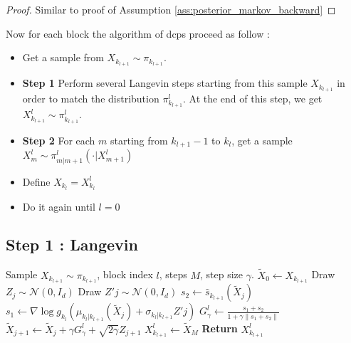 \documentclass[12pt]{article}
\begin{document}
\begin{proof}
    Similar to proof of Assumption \ref{ass:posterior_markov_backward}
\end{proof}

Now for each block the algorithm of dcps proceed as follow :
\begin{itemize}
\item Get a sample from $X_{k_{l+1}} \sim \pi_{k_{l+1}}$.
\item \textbf{Step 1} Perform several Langevin steps starting from this sample $X_{k_{l+1}}$ in order to 
match the distribution $\pi^l_{k_{l+1}}$. At the end of this step, we get $X^l_{k_{l+1}} \sim \pi^l_{k_{l+1}}$.
\item \textbf{Step 2} For each $m$ starting from $k_{l+1}-1$ to $k_l$, get a sample $X^l_{m} \sim \pi^l_{m|m+1}(\cdot|X^l_{m+1})$
\item Define $X_{k_l} = X^l_{k_l}$
\item Do it again until $l=0$
\end{itemize}

\subsection{Step 1 : Langevin }

\begin{algorithm}
\caption{DCPS Step 1: Langevin guidance for block $l$}
\label{alg:dcps_step1}
\begin{algorithmic}[1]
    \Require Sample $X_{k_{l+1}} \sim \pi_{k_{l+1}}$, block index $l$, steps $M$, step size $\gamma$.
    \State $\tilde{X}_0 \gets X_{k_{l+1}}$
        \State Draw $Z_{j} \sim \mathcal{N}(0, I_d)$
        \State Draw $Z'{j} \sim \mathcal{N}(0, I_d)$
        \State $s_2 \gets \hat{s}_{k_{l+1}}(\tilde{X}_j)$
        \State $s_1 \gets \nabla \log g_{k_l}(\mu_{k_l|k_{l+1}}(\tilde{X}_j) + \sigma_{k_l|k_{l+1}} Z'{j})$
        \State $G_\gamma^l \gets \frac{s_1 + s_2}
        {1 + \gamma \|s_1 + s_2\|}$ 
        \State $\tilde{X}_{j+1} \gets \tilde{X}_j + \gamma G_\gamma^l + \sqrt{2 \gamma} Z_{j+1}$
    \EndFor
    \State $X_{k_{l+1}}^l \gets \tilde{X}_M$
    \State \textbf{Return} $X_{k_{l+1}}^l$
\end{algorithmic}
\end{algorithm}
\end{document}
